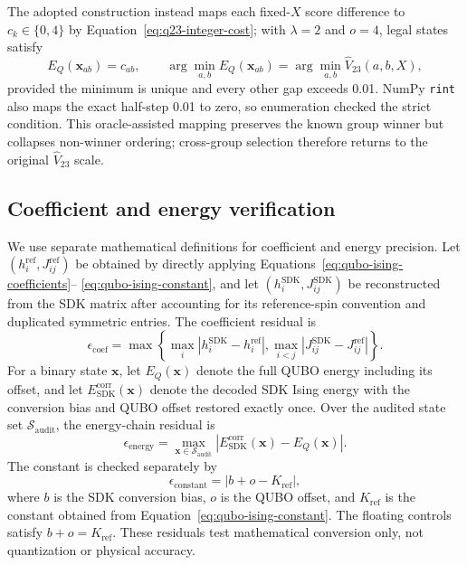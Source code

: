 The adopted construction instead maps each fixed-$X$ score difference to
$c_k\in\{0,4\}$ by Equation~\eqref{eq:q23-integer-cost}; with
$\lambda=2$ and $o=4$, legal states satisfy
\begin{equation}
 E_Q(\bm{x}_{ab})=c_{ab},
 \qquad
 \arg\min_{a,b}E_Q(\bm{x}_{ab})=
 \arg\min_{a,b}\widehat V_{23}(a,b,X),
 \label{eq:group-winner-preservation}
\end{equation}
provided the minimum is unique and every other gap exceeds 0.01.  NumPy
\texttt{rint} also maps the exact half-step 0.01 to zero, so enumeration
checked the strict condition.  This oracle-assisted mapping preserves the
known group winner but collapses non-winner ordering; cross-group selection
therefore returns to the original $\widehat V_{23}$ scale.

\subsection{Coefficient and energy verification}

We use separate mathematical definitions for coefficient and energy
precision.  Let $(h_i^{\mathrm{ref}},J_{ij}^{\mathrm{ref}})$ be obtained by
directly applying Equations~\eqref{eq:qubo-ising-coefficients}--
\eqref{eq:qubo-ising-constant}, and let
$(h_i^{\mathrm{SDK}},J_{ij}^{\mathrm{SDK}})$ be reconstructed from the SDK
matrix after accounting for its reference-spin convention and duplicated
symmetric entries.  The coefficient residual is
\begin{equation}
 \epsilon_{\mathrm{coef}}=
 \max\left\{
   \max_i|h_i^{\mathrm{SDK}}-h_i^{\mathrm{ref}}|,
   \max_{i<j}|J_{ij}^{\mathrm{SDK}}-J_{ij}^{\mathrm{ref}}|
 \right\}.
 \label{eq:coefficient-residual}
\end{equation}
For a binary state $\bm x$, let $E_Q(\bm x)$ denote the full QUBO energy
including its offset, and let $E_{\mathrm{SDK}}^{\mathrm{corr}}(\bm x)$
denote the decoded SDK Ising energy with the conversion bias and QUBO
offset restored exactly once.  Over the audited state set
$\mathcal S_{\mathrm{audit}}$, the energy-chain residual is
\begin{equation}
 \epsilon_{\mathrm{energy}}=
 \max_{\bm x\in\mathcal S_{\mathrm{audit}}}
 \left|E_{\mathrm{SDK}}^{\mathrm{corr}}(\bm x)-E_Q(\bm x)\right|.
 \label{eq:energy-chain-residual}
\end{equation}
The constant is checked separately by
\begin{equation}
 \epsilon_{\mathrm{constant}}=|b+o-K_{\mathrm{ref}}|,
 \label{eq:constant-residual}
\end{equation}
where $b$ is the SDK conversion bias, $o$ is the QUBO offset, and
$K_{\mathrm{ref}}$ is the constant obtained from
Equation~\eqref{eq:qubo-ising-constant}.  The floating controls satisfy
$b+o=K_{\mathrm{ref}}$.  These residuals test mathematical conversion only,
not quantization or physical accuracy.

